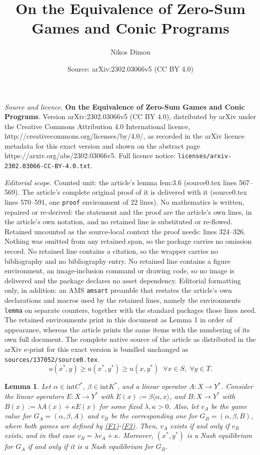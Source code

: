 \documentclass[10pt,a4paper]{amsart}
\title{\textbf{On the Equivalence of Zero-Sum Games and Conic Programs}}
\author{Nikos Dimou}
\date{Source: arXiv:2302.03066v5 (CC BY 4.0)}
\newtheorem{lemma}{Lemma}
\begin{document}
\maketitle

\noindent\emph{Source and licence.} \textbf{On the Equivalence of Zero-Sum Games and Conic Programs}. Version arXiv:2302.03066v5 (CC BY 4.0), distributed by arXiv under the Creative Commons Attribution 4.0 International licence, http://creativecommons.org/licenses/by/4.0/, as recorded in the arXiv licence metadata for this exact version and shown on the abstract page https://arxiv.org/abs/2302.03066v5. Full licence notice: \texttt{licenses/arxiv-2302.03066-CC-BY-4.0.txt}.\par\smallskip

\noindent\textit{Editorial scope.} Counted unit: the article's lemma lem:3.6 (source0.tex lines 567--569). The article's complete original proof of it is delivered with it (source0.tex lines 570--591, one \texttt{proof} environment of 22 lines). No mathematics is written, repaired or re-derived: the statement and the proof are the article's own lines, in the article's own notation, and no retained line is substituted or re-flowed.  Retained uncounted as the source-local context the proof needs: lines 324--326.  Nothing was omitted from any retained span, so the package carries no omission record.  No retained line contains a citation, so the wrapper carries no bibliography and no bibliography entry.  No retained line contains a figure environment, an image-inclusion command or drawing code, so no image is delivered and the package declares no asset dependency.  Editorial formatting only, in addition: an AMS \texttt{amsart} preamble that restates the article's own declarations and macros used by the retained lines, namely the environments \texttt{lemma} on separate counters, together with the standard packages those lines need.  The retained environments print in this document as Lemma 1 in order of appearance, whereas the article prints the same items with the numbering of its own full document.  The complete native source of the article as distributed in the arXiv e-print for this exact version is bundled unchanged as \texttt{sources/137052/source0.tex}.
\begin{equation}\label{eq:2.6}
    u(x^*,y)\geq u(x^*,y^*)\geq u(x,y^*)\;\;\forall x\in S,\;\forall y\in T.
\end{equation}

\begin{lemma}\label{lem:3.6}
     Let $\alpha\in \text{int}C^*$, $\beta\in \text{int}K^*$, and a linear operator $A:X\rightarrow Y^*$. Consider the linear operators $E:X\rightarrow Y^*$ with $E(x):= \beta\langle\alpha,x\rangle$, and $B:X\rightarrow Y^*$ with $B(x):=\lambda A(x)+\kappa E(x)$ for some fixed $\lambda,\kappa >0$. Also, let $v_A$ be the game value for $G_A=(\alpha,\beta,A)$ and $v_B$ be the corresponding one for $G_B=(\alpha,\beta,B)$, where both games are defined by \hyperlink{f1}{(F1)}-\hyperlink{f3}{(F3)}. Then, $v_A$ exists if and only if $v_B$ exists, and in that case $v_B=\lambda v_A+\kappa$. Moreover, $(x^*,y^*)$ is a Nash equilibrium for $G_A$ if and only if it is a Nash equilibrium for $G_B$.
\end{lemma}
\end{document}
